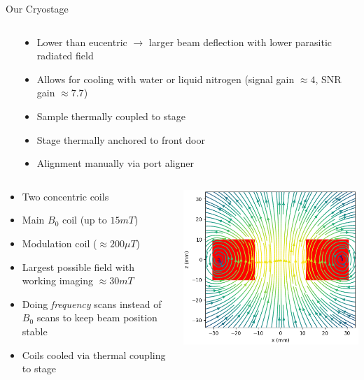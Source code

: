 \documentclass[final]{beamer}
\begin{document}
\begin{frame}[fragile]{}
\begin{columns}[T]
\begin{column}{.49\linewidth}
\begin{block}{\Large Our Cryostage}
\begin{columns}
\begin{column}{0.45\columnwidth}
			\end{column}
			\begin{column}{0.45\columnwidth}
				\begin{itemize}
					\item Lower than eucentric $\to$ larger beam deflection with lower parasitic radiated field
					\item Allows for cooling with water or liquid nitrogen (signal gain $\approx 4$, SNR gain $\approx 7.7$)
					\item Sample thermally coupled to stage
					\item Stage thermally anchored to front door
					\item Alignment manually via port aligner
				\end{itemize}
			\end{column}
		\end{columns}
		\vspace{1cm}
		\begin{columns}
			\begin{column}{0.45\columnwidth}
				\begin{itemize}
					\item Two concentric coils
					\item Main $B_0$ coil (up to $15 mT$)
					\item Modulation coil ($\approx 200 \mu T$)
					\item Largest possible field with working imaging $\approx 30 mT$
					\item Doing \textit{frequency} scans instead of $B_0$ scans to keep beam position stable
					\item Coils cooled via thermal coupling to stage
				\end{itemize}
			\end{column}
			\begin{column}{0.45\columnwidth}
				\includegraphics[width=\columnwidth]{./figures/coilfields.png}	

\end{column}
\end{columns}
\end{block}
\end{column}
\end{columns}
\end{frame}
\end{document}

